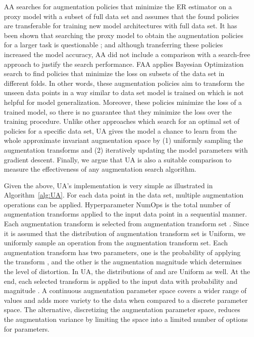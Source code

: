 \documentclass[runningheads]{llncs}
\begin{document}
	
	AA searches for augmentation policies that minimize the ER estimator on a proxy model with a subset of full data set and assumes that the found policies are transferable for training new model architectures with full data set. It has been shown that searching the proxy model to obtain the augmentation policies for a larger task is questionable \cite{cubuk2019randaugment}; and although transferring these policies increased the model accuracy, AA did not include a  comparison with a search-free approach to justify the search performance. FAA applies Bayesian Optimization search to find policies that minimize the loss on subsets of the data set in different folds. In other words, these augmentation policies aim to transform the unseen data points in a way similar to data set model is trained on which is not helpful for model generalization. Moreover, these policies minimize the loss of a trained model, so there is no guarantee that they minimize the loss over the training procedure. Unlike other approaches which search for an optimal set of policies for a specific data set, UA gives the model a chance to learn from the whole approximate invariant augmentation space by (1) uniformly sampling the augmentation transforms and (2) iteratively updating the model parameters with gradient descent. Finally, we argue that UA is also a suitable comparison to measure the  effectiveness of any augmentation search algorithm. 
	
	Given the above, UA's implementation is very simple as illustrated in Algorithm~\ref{alg:UA}. For each data point  in the data set, multiple augmentation operations can be applied. Hyperparameter NumOps is the total number of augmentation transforms applied to the input data point in a sequential manner. Each augmentation transform is selected from augmentation transform set . Since it is assumed that the distribution of augmentation transform set  is Uniform, we uniformly sample an operation from the augmentation transform set. Each augmentation transform  has two parameters, one is the probability of applying the transform , and the other is the augmentation magnitude  which determines the level of distortion. In UA, the distributions of  and  are Uniform as well. At the end, each selected transform  is applied to the input data  with probability  and magnitude . 
	A continuous augmentation parameter space covers a wider range of values and adds more variety to the data when compared to a discrete parameter space. The alternative, discretizing the augmentation parameter space, reduces the augmentation variance by limiting the space into a limited number of options for parameters.
	
\end{document}

